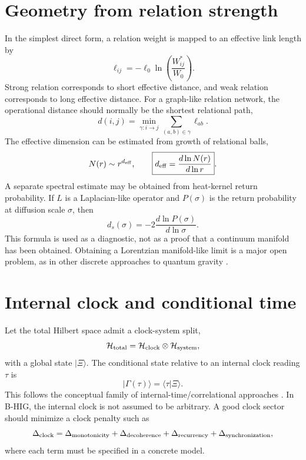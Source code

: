 \documentclass[11pt,a4paper]{article}
\newcommand{\BHIG}{B-HIG}
\begin{document}
\section{Geometry from relation strength}
In the simplest direct form, a relation weight is mapped to an effective link length by
\begin{equation}
\boxed{\ell_{ij}=-\ell_0\ln\left(\frac{W_{ij}^{\ast}}{W_0}\right)} .
\label{eq:link_length}
\end{equation}
Strong relation corresponds to short effective distance, and weak relation corresponds to long effective distance. For a graph-like relation network, the operational distance should normally be the shortest relational path,
\begin{equation}
\boxed{d(i,j)=\min_{\gamma:i\to j}\sum_{(a,b)\in\gamma}\ell_{ab}} .
\label{eq:geodesic}
\end{equation}
The effective dimension can be estimated from growth of relational balls,
\begin{equation}
N(r)\sim r^{d_{\rm eff}}, \qquad
\boxed{d_{\rm eff}=\frac{d\ln N(r)}{d\ln r}} .
\label{eq:dimension_growth}
\end{equation}
A separate spectral estimate may be obtained from heat-kernel return probability. If $L$ is a Laplacian-like operator and $P(\sigma)$ is the return probability at diffusion scale $\sigma$, then
\begin{equation}
\boxed{d_s(\sigma)=-2\frac{d\ln P(\sigma)}{d\ln\sigma}} .
\label{eq:spectral_dimension}
\end{equation}
This formula is used as a diagnostic, not as a proof that a continuum manifold has been obtained. Obtaining a Lorentzian manifold-like limit is a major open problem, as in other discrete approaches to quantum gravity \cite{Bombelli1987,Ambjorn2005}.

\section{Internal clock and conditional time}
Let the total Hilbert space admit a clock-system split,
\begin{equation}
\mathcal{H}_{\rm total}=\mathcal{H}_{\rm clock}\otimes\mathcal{H}_{\rm system},
\end{equation}
with a global state $|\Xi\rangle$. The conditional state relative to an internal clock reading $\tau$ is
\begin{equation}
\boxed{|\Gamma(\tau)\rangle=\langle\tau|\Xi\rangle} .
\label{eq:internal_time}
\end{equation}
This follows the conceptual family of internal-time/correlational approaches \cite{PageWootters1983}. In \BHIG{}, the internal clock is not assumed to be arbitrary. A good clock sector should minimize a clock penalty such as
\begin{equation}
\Delta_{\rm clock}=\Delta_{\rm monotonicity}+\Delta_{\rm decoherence}+\Delta_{\rm recurrency}+\Delta_{\rm synchronization},
\end{equation}
where each term must be specified in a concrete model.
\end{document}
